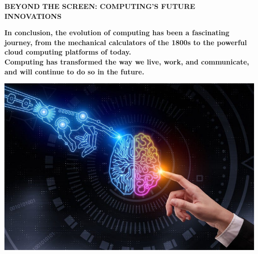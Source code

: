 \documentclass[pdf,aspectratio=169]{beamer}
\begin{document}
\begin{frame}{\textbf{BEYOND THE SCREEN: COMPUTING'S FUTURE INNOVATIONS}}
	\begin{minipage}{0.6\textwidth}
		\textbf{\text In conclusion, the evolution of computing has been a fascinating journey, from the mechanical calculators of the 1800s to the powerful cloud computing platforms of today.}
		\\
		\textbf{\text Computing has transformed the way we live, work, and communicate, and will continue to do so in the future.}
	\end{minipage}
	\hfill
	\begin{minipage}{0.3\textwidth}
		\centering
		\includegraphics[width=\textwidth]{figs/IMG10}
	\end{minipage}
\end{frame}
\end{document}

